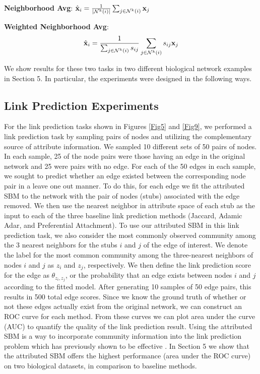 {\bf Neighborhood Avg}: $\hat{{\bf x}}_{i}= \frac{1}{|\mathcal{N}^{k}(i)|}\sum_{j \in \mathcal{N}^{k}(i)} {\bf x}_{j}$

{\bf Weighted Neighborhood Avg}: \[\hat{{\bf x}}_{i}=\frac{1}{\sum_{j \in \mathcal{N}^{k}(i)}s_{ij}}\sum_{j \in \mathcal{N}^{k}(i)}s_{ij}{\bf x}_{j}\]

We show results for these two tasks in two different biological network examples in Section 5. In particular, the experiments were designed in the following ways.

\subsection{Link Prediction Experiments}
For the link prediction tasks shown in Figures \ref{Fig5} and \ref{Fig9}, we performed a link prediction task by sampling pairs of nodes and utilizing the complementary source of attribute information. We sampled 10 different sets of 50 pairs of nodes. In each sample, 25 of the node pairs were those having an edge in the original network and 25 were pairs with no edge. For each of the 50 edges in each sample, we sought to predict whether an edge existed between the corresponding node pair in a leave one out manner. To do this, for each edge we fit the attributed SBM to the network with the pair of nodes (stubs) associated with the edge removed. We then use the nearest neighbor in attribute space of each stub as the input to each of the three baseline link prediction methods (Jaccard, Adamic Adar, and Preferential Attachment). To use our attributed SBM in this link prediction task, we also consider the most commonly observed community among the 3 nearest neighbors for the stubs $i$ and $j$ of the edge of interest. We denote the label for the most common community among the three-nearest neighbors of nodes $i$ and $j$ as $z_{i}$ and $z_{j}$, respectively. We then define the link prediction score for the edge as $\theta_{z_{i},z_{j}}$, or the probability that an edge exists between nodes $i$ and $j$ according to the fitted model. After generating 10 samples of 50 edge pairs, this results in 500 total edge scores. Since we know the ground truth of whether or not these edges actually exist from the original network, we can construct an ROC curve for each method. From these curves we can plot area under the curve (AUC) to quantify the quality of the link prediction result. Using the attributed SBM is a way to incorporate community information into the link prediction problem which has previously shown to be effective \cite{linkComm}. In Section 5 we show that the attributed SBM offers the highest performance (area under the ROC curve) on two biological datasets, in comparison to baseline methods. 
